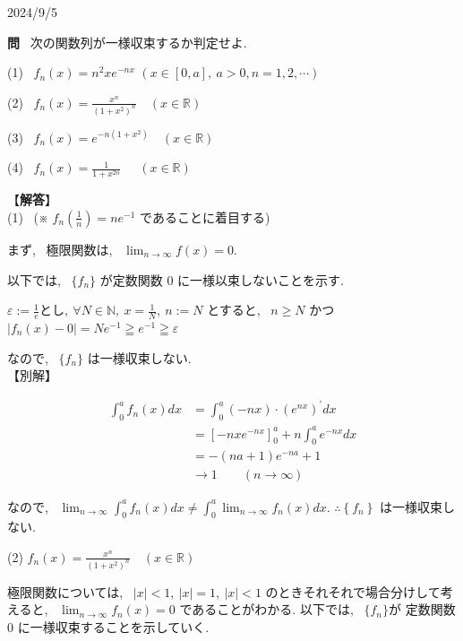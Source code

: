 \documentclass[10pt]{jsarticle}
\begin{document}
\begin{flushright}
2024/9/5
\end{flushright}
\noindent
\textbf{問} \ 次の関数列が一様収束するか判定せよ.

(1) \ $f_n (x) = n^2 x e^{-nx}$ \quad
$(x \in [0, a], \ a > 0, n = 1, 2, \cdots)$

(2) \ $f_{n}(x)= \displaystyle\frac{x^{n}}{\left(1+x^{2}\right)^{n}} \quad(x \in \mathbb{R})$

(3) \ $f_{n}(x)=e^{-n\left(1+x^{2}\right)} \quad (x \in \mathbb{R})$


(4) \ $f_{n}(x)= \displaystyle\frac{1}{1+x^{2 n}} \quad \ \  (x \in \mathbb{R})$

\bigskip

\newpage
\noindent
【\textbf{解答}】\\
(1) \ (※ $f_n(\frac{1}{n}) = ne^{-1}$ であることに着目する)

まず, \ 極限関数は, \ $\displaystyle \lim _{n \rightarrow \infty} f(x)=0$.

以下では, \ $\{f_n \}$ が定数関数 $0$ に一様以束しないことを示す.

$\varepsilon:= \displaystyle\frac{1}{e} とし, \ \forall N \in \mathbb{N}, \  x= \displaystyle \frac{1}{N}, \ n:=N$ とすると, \ $n \ge N$ かつ
$\left|f_{n}(x)-0\right|=N e^{-1} \geqq e^{-1} \geqq \varepsilon$

なので, \ $\{f_n\}$ は一様収束しない.\\

【別解】

$$
\begin{aligned}
\int_{0}^{a} f_{n}(x) d x & =\int_{0}^{a}(-n x) \cdot\left(e^{n x}\right)^{\prime} d x \\
& =\left[-n x e^{-n x}\right]_{0}^{a}+n \int_{0}^{a} e^{-n x} d x \\
& =-(n a+1) e^{-n a}+1 \\
& \rightarrow 1 \qquad (n \rightarrow \infty)
\end{aligned}
$$

なので, \ $\displaystyle \lim _{n \rightarrow \infty} \int_{0}^{a} f_{n}(x) d x \neq \int_{0}^{a} \lim _{n \rightarrow \infty} f_n(x) d x$. \qquad
$\therefore\left\{f_{n}\right\} $ は一様収束しない.

\bigskip

\noindent
(2) $f_{n}(x)= \displaystyle \frac{x^{n}}{\left(1+x^{2}\right)^{n}} \quad(x \in \mathbb{R})$

極限関数については, \ $|x| < 1, \ |x| = 1, \ |x| < 1$ のときそれそれで場合分けして考えると, \ $\displaystyle \lim _{n \rightarrow \infty} f_{n}(x)=0$ であることがわかる. 以下では, \ $\{f_n\}$が 定数関数$0$ に一様収束することを示していく.
\end{document}
